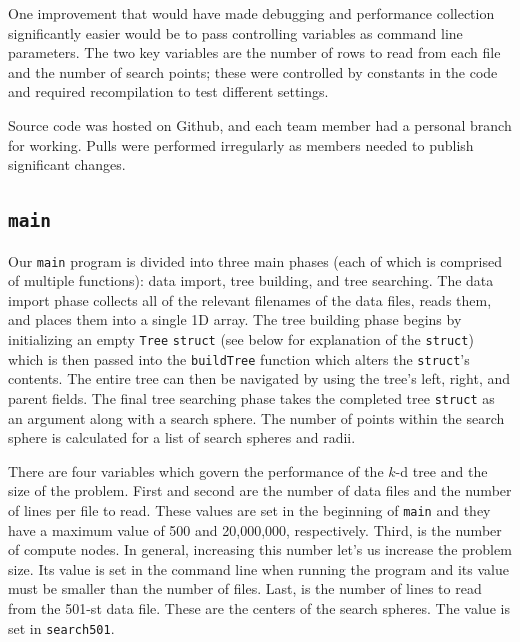 \documentclass{article}
\begin{document}
One improvement that would have made debugging and performance collection significantly easier would be to pass controlling variables as command line parameters. The two key variables are the number of rows to read from each file and the number of search points; these were controlled by constants in the code and required recompilation to test different settings.

Source code was hosted on Github, and each team member had a personal branch for working. Pulls were performed irregularly as members needed to publish significant changes.


%
%

\subsection{\texttt{main}}

Our \texttt{main} program is divided into three main phases (each of which is comprised of multiple functions): data import, tree building, and tree searching. The data import phase collects all of the relevant filenames of the data files, reads them, and places them into a single 1D array. The tree building phase begins by initializing an empty \texttt{Tree} \texttt{struct} (see below for explanation of the \texttt{struct}) which is then passed into the \texttt{buildTree} function which alters the \texttt{struct}'s contents. The entire tree can then be navigated by using the tree's left, right, and parent fields. The final tree searching phase takes the completed tree \texttt{struct} as an argument along with a search sphere. The number of points within the search sphere is calculated for a list of search spheres and radii.

There are four variables which govern the performance of the $k$-d tree and the size of the problem. First and second are the number of data files and the number of lines per file to read. These values are set in the beginning of \texttt{main} and they have a maximum value of 500 and 20,000,000, respectively. Third, is the number of compute nodes. In general, increasing this number let's us increase the problem size. Its value is set in the command line when running the program and its value must be smaller than the number of files. Last, is the number of lines to read from the 501-st data file. These are the centers of the search spheres. The value is set in \texttt{search501}.


%
%
\end{document}
